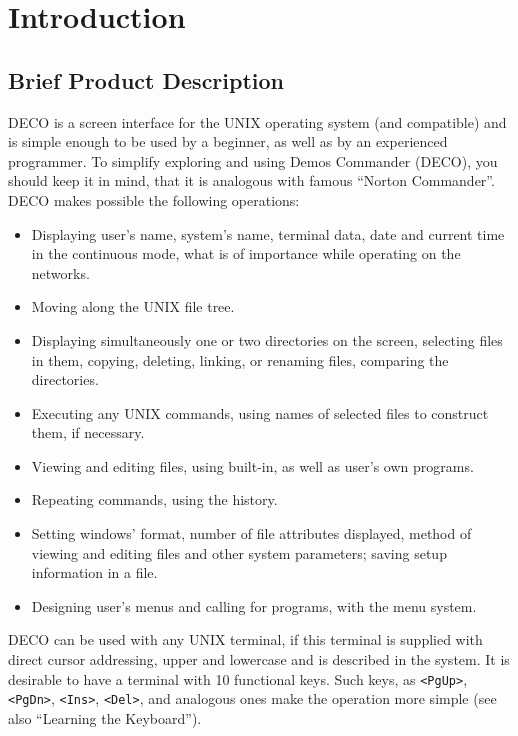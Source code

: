 


\section{Introduction}

\subsection{Brief Product Description}

DECO is a screen interface for the UNIX operating system (and compatible)
and is simple enough to be used by a beginner, as well as by an experienced
programmer. To simplify exploring and using Demos Commander (DECO),
you should keep it in mind, that it is analogous with famous
``Norton Commander''. DECO makes possible the following
operations:
\begin{itemize}
\item
Displaying user's name, system's name, terminal data, date and current
time in the continuous mode, what is of importance while
operating on the networks.
\item
Moving along the UNIX file tree.
\item
Displaying simultaneously one or two directories on the screen,
selecting files in them, copying, deleting, linking, or renaming files,
comparing the directories.
\item
Executing any UNIX commands, using names of
selected files to construct them, if necessary.
\item
Viewing and editing files, using built-in, as well
as user's own programs.
\item
Repeating commands, using the history.
\item
Setting windows' format, number of file attributes displayed, method of
viewing and editing files and other system parameters;
saving setup information in a file.
\item
Designing user's menus and calling for programs, with the menu system.
\end{itemize}

DECO can be used with any UNIX terminal, if this 
terminal is supplied with direct cursor addressing, 
upper and lowercase and is described in the system.
It is desirable to have a terminal with 10 functional 
keys. Such keys, as {\tt <PgUp>}, {\tt <PgDn>},
{\tt <Ins>}, {\tt <Del>}, and
analogous ones make the operation more simple (see 
also ``Learning the Keyboard'').

